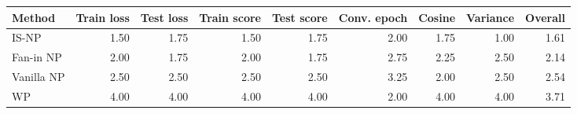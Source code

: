 \begin{tabular}{lrrrrrrrr}
\toprule
Method & Train loss & Test loss & Train score & Test score & Conv. epoch & Cosine & Variance & Overall \\
\midrule
IS-NP & 1.50 & 1.75 & 1.50 & 1.75 & 2.00 & 1.75 & 1.00 & 1.61 \\
Fan-in NP & 2.00 & 1.75 & 2.00 & 1.75 & 2.75 & 2.25 & 2.50 & 2.14 \\
Vanilla NP & 2.50 & 2.50 & 2.50 & 2.50 & 3.25 & 2.00 & 2.50 & 2.54 \\
WP & 4.00 & 4.00 & 4.00 & 4.00 & 2.00 & 4.00 & 4.00 & 3.71 \\
\bottomrule
\end{tabular}
